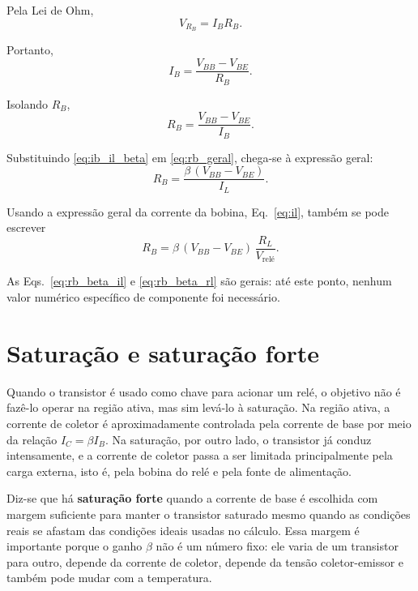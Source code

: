\documentclass[12pt,a4paper]{article}
\newcommand{\Vbb}{V_{BB}}
\newcommand{\Vbe}{V_{BE}}
\newcommand{\Ic}{I_C}
\newcommand{\Ib}{I_B}
\newcommand{\Il}{I_L}
\newcommand{\Rb}{R_B}
\newcommand{\Rl}{R_L}
\begin{document}
Pela Lei de Ohm,
\begin{equation}
V_{\Rb} = \Ib\Rb.
\end{equation}

Portanto,
\begin{equation}
\Ib = \frac{\Vbb - \Vbe}{\Rb}.
\label{eq:ib_ohm}
\end{equation}

Isolando $\Rb$,
\begin{equation}
\Rb = \frac{\Vbb - \Vbe}{\Ib}.
\label{eq:rb_geral}
\end{equation}

Substituindo \eqref{eq:ib_il_beta} em \eqref{eq:rb_geral}, chega-se à expressão geral:
\begin{equation}
\boxed{\Rb = \frac{\beta\,(\Vbb - \Vbe)}{\Il}}.
\label{eq:rb_beta_il}
\end{equation}

Usando a expressão geral da corrente da bobina, Eq.~\eqref{eq:il}, também se pode escrever
\begin{equation}
\boxed{\Rb = \beta\,(\Vbb - \Vbe)\,\frac{\Rl}{V_{\text{relé}}}}.
\label{eq:rb_beta_rl}
\end{equation}

As Eqs.~\eqref{eq:rb_beta_il} e \eqref{eq:rb_beta_rl} são gerais: até este ponto, nenhum valor numérico específico de componente foi necessário.


\section{Saturação e saturação forte}

Quando o transistor é usado como chave para acionar um relé, o objetivo não é fazê-lo operar na região ativa, mas sim levá-lo à saturação. Na região ativa, a corrente de coletor é aproximadamente controlada pela corrente de base por meio da relação $\Ic = \beta\Ib$. Na saturação, por outro lado, o transistor já conduz intensamente, e a corrente de coletor passa a ser limitada principalmente pela carga externa, isto é, pela bobina do relé e pela fonte de alimentação.

Diz-se que há \textbf{saturação forte} quando a corrente de base é escolhida com margem suficiente para manter o transistor saturado mesmo quando as condições reais se afastam das condições ideais usadas no cálculo. Essa margem é importante porque o ganho $\beta$ não é um número fixo: ele varia de um transistor para outro, depende da corrente de coletor, depende da tensão coletor-emissor e também pode mudar com a temperatura.
\end{document}
